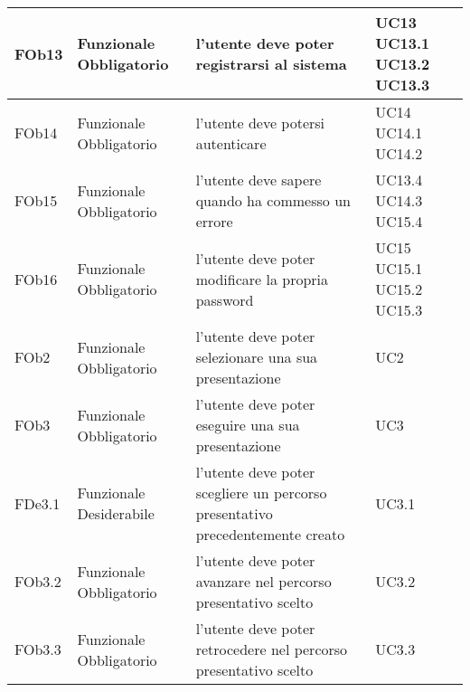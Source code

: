 \begin{longtable}{|l|p{2.5cm}|p{5cm}|p{3.5cm}|}
\hline
FOb13 & Funzionale \linebreak Obbligatorio & l'utente deve poter registrarsi al sistema & UC13 \linebreak UC13.1 \linebreak UC13.2 \linebreak UC13.3 \linebreak \\
\hline
FOb14 & Funzionale \linebreak Obbligatorio & l'utente deve potersi autenticare & UC14 \linebreak UC14.1 \linebreak UC14.2 \linebreak \\
\hline
FOb15 & Funzionale \linebreak Obbligatorio & l'utente deve sapere quando ha commesso un errore & UC13.4 \linebreak UC14.3 \linebreak UC15.4 \linebreak \\
\hline
FOb16 & Funzionale \linebreak Obbligatorio & l'utente deve poter modificare la propria password & UC15 \linebreak UC15.1 \linebreak UC15.2 \linebreak UC15.3 \linebreak \\
\hline
FOb2 & Funzionale \linebreak Obbligatorio & l'utente deve poter selezionare una sua presentazione & UC2 \linebreak \\
\hline
FOb3 & Funzionale \linebreak Obbligatorio & l'utente deve poter eseguire una sua presentazione & UC3 \linebreak \\
\hline
FDe3.1 & Funzionale \linebreak Desiderabile & l'utente deve poter scegliere un percorso presentativo precedentemente creato & UC3.1 \linebreak  \\
\hline
FOb3.2 & Funzionale \linebreak Obbligatorio & l'utente deve poter avanzare nel percorso presentativo scelto & UC3.2 \linebreak  \\
\hline
FOb3.3 & Funzionale \linebreak Obbligatorio & l'utente deve poter retrocedere nel percorso presentativo scelto & UC3.3 \linebreak  \\

\end{longtable}

